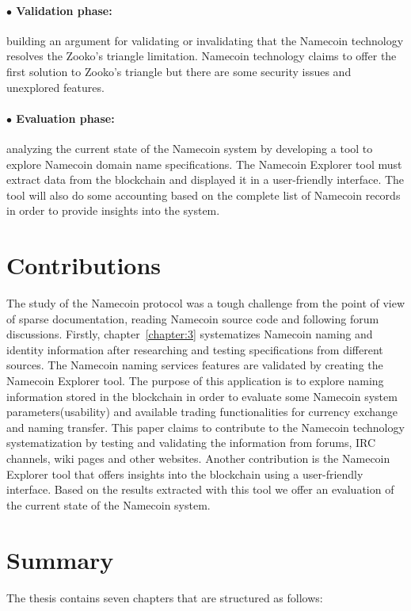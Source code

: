 \paragraph{$\bullet$ Validation phase:} building an argument for validating or invalidating that the Namecoin technology resolves the Zooko's triangle limitation. Namecoin technology claims to offer the first solution to Zooko's triangle but there are some security issues and unexplored features.
\paragraph{$\bullet$ Evaluation phase:} analyzing the current state of the Namecoin system by developing a tool to explore Namecoin domain name specifications. The Namecoin Explorer tool must extract data from the blockchain and displayed it in a user-friendly interface. The tool will also do some accounting based on the complete list of Namecoin records in order to provide insights into the system.


\section{Contributions}
\label{sec:contrib-lbl}
The study of the Namecoin protocol was a tough challenge from the point of view of sparse documentation, reading Namecoin source code and following forum discussions. Firstly, chapter~\ref{chapter:3} systematizes Namecoin naming and identity information after researching and testing specifications from different sources. The Namecoin naming services features are validated by creating the Namecoin Explorer tool. The purpose of this application is to explore naming information stored in the blockchain in order to evaluate some Namecoin system parameters(usability) and available trading functionalities for currency exchange and naming transfer. This paper claims to contribute to the Namecoin technology systematization by testing and validating the information from forums, IRC channels, wiki pages and other websites. Another contribution is the Namecoin Explorer tool that offers insights into the blockchain using a user-friendly interface. Based on the results extracted with this tool we offer an evaluation of the current state of the Namecoin system.


\section{Summary}
\label{sec:summary-lbl}
The thesis contains seven chapters that are structured as follows:
